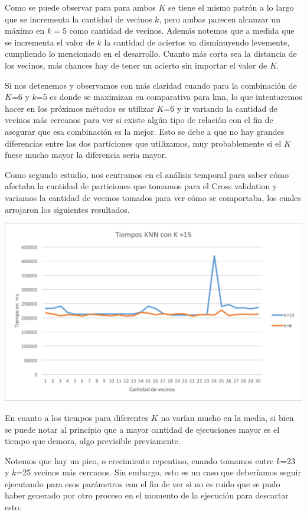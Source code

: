 Como se puede observar para para ambos $K$ se tiene el mismo patrón a lo largo que se incrementa la cantidad de vecinos $k$, pero ambas parecen alcanzar un máximo en $k=5$ como cantidad de vecinos. Además notemos que a medida que se incrementa el valor de $k$ la cantidad de aciertos va disminuyendo levemente, cumpliendo lo mencionado en el desarrollo. Cuanto más corta sea la distancia de los vecinos, más chances hay de tener un acierto sin importar el valor de $K$.

Si nos detenemos y observamos con más claridad cuando para la combinación de $K$=6 y $k$=5 es donde se maximizan en comparativa para knn, lo que intentaremos hacer en los próximos métodos es utilizar $K$=6 y ir variando la cantidad de vecinos más cercanos para ver si existe algún tipo de relación con el fin de asegurar que esa combinación es la mejor. Esto se debe a que no hay grandes diferencias entre las dos particiones que utilizamos, muy probablemente si el $K$ fuese mucho mayor la diferencia seria mayor.

Como segundo estudio, nos centramos en el análisis temporal para saber cómo afectaba la cantidad de particiones que tomamos para el Cross validation y variamos la cantidad de vecinos tomados para ver cómo se comportaba, los cuales arrojaron los siguientes resultados. 

\begin{center}
\includegraphics[scale=0.6]{imagenes/TiemposKNN.png}
\end{center}

En cuanto a los tiempos para diferentes $K$ no varían mucho en la media, si bien se puede notar al principio que a mayor cantidad de ejecuciones mayor es el tiempo que demora, algo previsible previamente.

Notemos  que hay un pico, o crecimiento repentino, cuando tomamos entre $k$=23 y $k$=25 vecinos más cercanos. Sin embargo, esto es un caso que deberíamos seguir ejecutando para esos parámetros con el fin de ver si no es ruido que se pudo haber generado por otro proceso en el momento de la ejecución para descartar esto.

